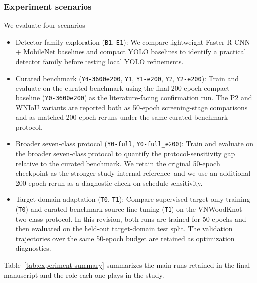 \documentclass[10pt,a4paper]{article}
\begin{document}
\subsubsection{Experiment scenarios}

We evaluate four scenarios.
\begin{itemize}
\item Detector-family exploration (\texttt{B1}, \texttt{E1}): We compare lightweight Faster R-CNN + MobileNet baselines and compact YOLO baselines to identify a practical detector family before testing local YOLO refinements.

\item Curated benchmark (\texttt{Y0-3600e200}, \texttt{Y1}, \texttt{Y1-e200}, \texttt{Y2}, \texttt{Y2-e200}): Train and evaluate on the curated benchmark using the final 200-epoch compact baseline (\texttt{Y0-3600e200}) as the literature-facing confirmation run. The P2 and WNIoU variants are reported both as 50-epoch screening-stage comparisons and as matched 200-epoch reruns under the same curated-benchmark protocol.

\item Broader seven-class protocol (\texttt{Y0-full}, \texttt{Y0-full\_e200}): Train and evaluate on the broader seven-class protocol to quantify the protocol-sensitivity gap relative to the curated benchmark. We retain the original 50-epoch checkpoint as the stronger study-internal reference, and we use an additional 200-epoch rerun as a diagnostic check on schedule sensitivity.

\item Target domain adaptation (\texttt{T0}, \texttt{T1}): Compare supervised target-only training (\texttt{T0}) and curated-benchmark source fine-tuning (\texttt{T1}) on the VNWoodKnot two-class protocol. In this revision, both runs are trained for 50 epochs and then evaluated on the held-out target-domain test split. The validation trajectories over the same 50-epoch budget are retained as optimization diagnostics.
\end{itemize}

Table~\ref{tab:experiment-summary} summarizes the main runs retained in the final manuscript and the role each one plays in the study.
\end{document}
